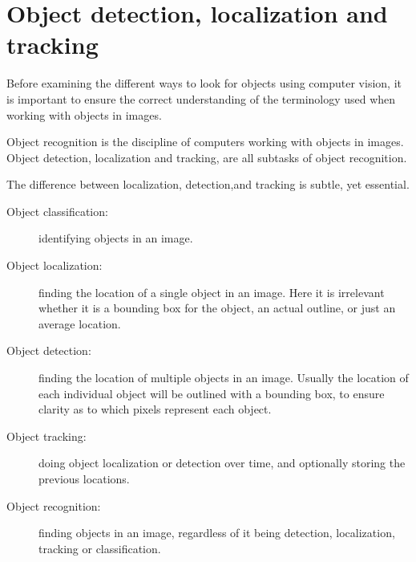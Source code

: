 \section{Object detection, localization and tracking}\label{sec:anal:objdet}
Before examining the different ways to look for objects using computer vision, it is important to ensure the correct understanding of the terminology used when working with objects in images.


Object recognition is the discipline of computers working with objects in images.
Object detection, localization and tracking, are all subtasks of object recognition.


The difference between localization, detection,and tracking is subtle, yet essential\cite{objecttrackdetect}.
\begin{description}
    \item[Object classification:]identifying objects in an image.
    \item[Object localization:]finding the location of a single object in an image{.} Here it is irrelevant whether it is a bounding box for the object, an actual outline, or just an average location. 
    \item[Object detection:]finding the location of multiple objects in an image{.} Usually the location of each individual object will be outlined with a bounding box, to ensure clarity as to which pixels represent each object.
    \item[Object tracking:] doing object localization or detection over time, and optionally storing the previous locations.
    \item[Object recognition:]finding objects in an image, regardless of it being detection, localization, tracking or classification. 
\end{description}